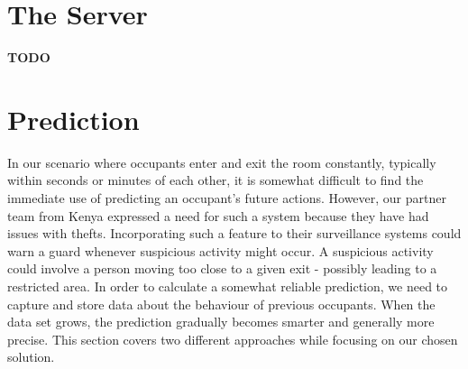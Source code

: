\section{The Server}
{\color[rgb]{1,0,0} \textbf{\large TODO}}

\section{Prediction}
In our scenario where occupants enter and exit the room constantly, typically within seconds or minutes of each other, it is somewhat difficult to find the immediate use of predicting an occupant's future actions. However, our partner team from Kenya expressed a need for such a system because they have had issues with thefts. Incorporating such a feature to their surveillance systems could warn a guard whenever suspicious activity might occur. A suspicious activity could involve a person moving too close to a given exit - possibly leading to a restricted area. In order to calculate a somewhat reliable prediction, we need to capture and store data about the behaviour of previous occupants. When the data set grows, the prediction gradually becomes smarter and generally more precise. This section covers two different approaches while focusing on our chosen solution. 

